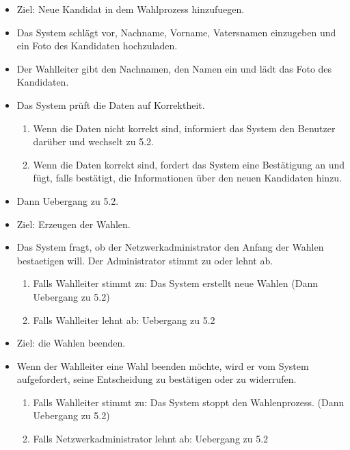 \documentclass[parskip=full,11pt,twoside]{scrartcl}
\begin{document}
\begin{itemize}
	\item Ziel: Neue Kandidat in dem Wahlprozess hinzufuegen.
	\item Das System schlägt vor, Nachname, Vorname, Vatersnamen einzugeben und ein Foto des Kandidaten hochzuladen.
	\item Der Wahlleiter gibt den Nachnamen, den Namen ein und lädt das Foto des Kandidaten.
	\item Das System prüft die Daten auf Korrektheit.
	\begin{enumerate}
		\item Wenn die Daten nicht korrekt sind, informiert das System den Benutzer darüber und wechselt zu 5.2.
		\item Wenn die Daten korrekt sind, fordert das System eine Bestätigung an und fügt, falls bestätigt, die Informationen über den neuen Kandidaten hinzu.
	\end{enumerate}
	\item Dann Uebergang zu 5.2.
\end{itemize}


\begin{itemize}
	\item Ziel: Erzeugen der Wahlen.
	\item Das System fragt, ob der Netzwerkadministrator den Anfang der Wahlen bestaetigen will.
	Der Administrator stimmt zu oder lehnt ab.
	\begin{enumerate}
		\item Falls Wahlleiter stimmt zu: Das System erstellt neue Wahlen (Dann Uebergang zu 5.2)
		\item Falls Wahlleiter lehnt ab: Uebergang zu 5.2
	\end{enumerate}
\end{itemize}


\begin{itemize}
	\item Ziel: die Wahlen beenden.
	\item Wenn der Wahlleiter eine Wahl beenden möchte, wird er vom System aufgefordert, seine Entscheidung zu bestätigen oder zu widerrufen.
	\begin{enumerate}
		\item Falls Wahlleiter stimmt zu: Das System stoppt den Wahlenprozess. (Dann Uebergang zu 5.2)
		\item Falls Netzwerkadministrator lehnt ab: Uebergang zu 5.2
	\end{enumerate}
\end{itemize}
\end{document}
